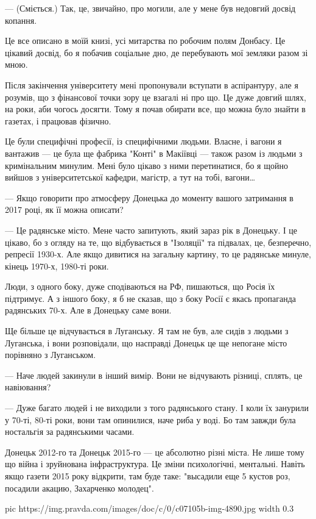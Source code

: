 — (Сміється.) Так, це, звичайно, про могили, але у мене був недовгий досвід
копання.

Це все описано в моїй книзі, усі митарства по робочим полям Донбасу. Це цікавий
досвід, бо я побачив соціальне дно, де перебувають мої земляки разом зі мною.

Після закінчення університету мені пропонували вступати в аспірантуру, але я
розумів, що з фінансової точки зору це взагалі ні про що. Це дуже довгий шлях,
на роки, аби чогось досягти. Тому я почав обирати все, що можна було знайти в
газетах, і працював фізично.

Це були специфічні професії, із специфічними людьми. Власне, і вагони я
вантажив — це була ще фабрика "Конті" в Макіївці — також разом із людьми з
кримінальним минулим. Мені було цікаво з ними перетинатися, бо я щойно вийшов з
університетської кафедри, магістр, а тут на тобі, вагони…

— Якщо говорити про атмосферу Донецька до моменту вашого затримання в 2017
році, як її можна описати?

— Це радянське місто. Мене часто запитують, який зараз рік в Донецьку. І це
цікаво, бо з огляду на те, що відбувається в "Ізоляції" та підвалах, це,
безперечно, репресії 1930-х. Але якщо дивитися на загальну картину, то це
радянське минуле, кінець 1970-х, 1980-ті роки.

Люди, з одного боку, дуже сподіваються на РФ, пишаються, що Росія їх підтримує.
А з іншого боку, я б не сказав, що з боку Росії є якась пропаганда радянських
70-х. Але в Донецьку саме вони. 

Ще більше це відчувається в Луганську. Я там не був, але сидів з людьми з
Луганська, і вони розповідали, що насправді Донецьк це ще непогане місто
порівняно з Луганськом.

— Наче людей закинули в інший вимір. Вони не відчувають різниці, сплять, це
навіювання?

— Дуже багато людей і не виходили з того радянського стану. І коли їх занурили
у 70-ті, 80-ті роки, вони там опинилися, наче риба у воді. Бо там завжди була
ностальгія за радянськими часами.

Донецьк 2012-го та Донецьк 2015-го — це абсолютно різні міста. Не лише тому що
війна і зруйнована інфраструктура. Це зміни психологічні, ментальні. Навіть
якщо газети 2015 року відкрити, там буде таке: "высадили еще 5 кустов роз,
посадили акацию, Захарченко молодец".

\ifcmt
  pic https://img.pravda.com/images/doc/c/0/c07105b-img-4890.jpg
	width 0.3
\fi

